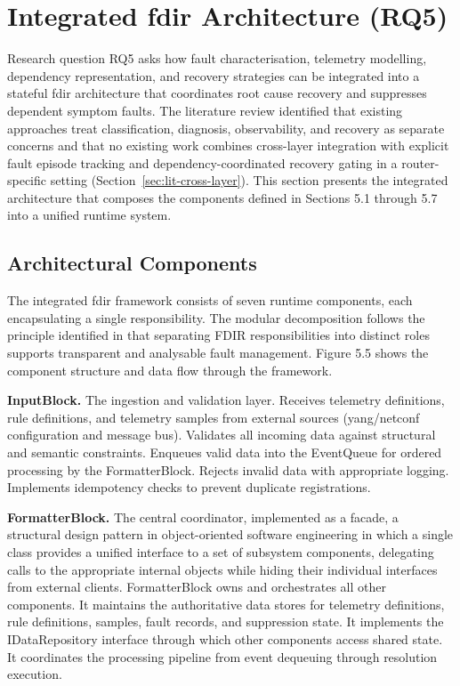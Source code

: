 \section{Integrated \gls{fdir} Architecture (RQ5)}\label{sec:integrated-architecture}

Research question RQ5 asks how fault characterisation, telemetry modelling, dependency representation, and recovery strategies can be integrated into a stateful \gls{fdir} architecture that coordinates root cause recovery and suppresses dependent symptom faults. The literature review identified that existing approaches treat classification, diagnosis, observability, and recovery as separate concerns \cite{ref5,ref6,ref29} and that no existing work combines cross-layer integration with explicit fault episode tracking and dependency-coordinated recovery gating in a router-specific setting (Section~\ref{sec:lit-cross-layer}). This section presents the integrated architecture that composes the components defined in Sections 5.1 through 5.7 into a unified runtime system.

\subsection{Architectural Components}\label{sec:architectural-components}

The integrated \gls{fdir} framework consists of seven runtime components, each encapsulating a single responsibility. The modular decomposition follows the principle identified in \cite{ref21,ref29} that separating FDIR responsibilities into distinct roles supports transparent and analysable fault management. Figure 5.5 shows the component structure and data flow through the framework.

\textbf{InputBlock.}  
The ingestion and validation layer. Receives telemetry definitions, rule definitions, and telemetry samples from external sources (\gls{yang}/\gls{netconf} configuration and message bus).  Validates all incoming data against structural and semantic constraints. Enqueues valid data into the EventQueue for ordered processing by the FormatterBlock. Rejects invalid data with appropriate logging. Implements idempotency checks to prevent duplicate registrations.

\textbf{FormatterBlock.}  
The central coordinator, implemented as a facade, a structural design pattern in object-oriented software engineering in which a single class provides a unified interface to a set of subsystem components, delegating calls to the appropriate internal objects while hiding their individual interfaces from external clients. FormatterBlock owns and orchestrates all other components. It maintains the authoritative data stores for telemetry definitions, rule definitions, samples, fault records, and suppression state. It implements the IDataRepository interface through which other components access shared state. It coordinates the processing pipeline from event dequeuing through resolution execution.

